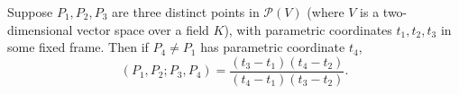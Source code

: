 Suppose $P_1, P_2, P_3$ are three distinct points in $\mathcal{P}(V)$ (where $V$ is a two-dimensional vector space over a field $K$), with parametric coordinates $t_1, t_2, t_3$ in some fixed frame. Then if $P_4 \neq P_1$ has parametric coordinate $t_4$,
$$(P_1, P_2; P_3, P_4) = \frac{(t_3 - t_1)(t_4 - t_2)}{(t_4 - t_1)(t_3 - t_2)}.$$
